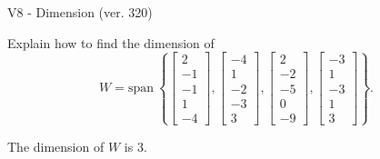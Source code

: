 \begin{exercise}
  \begin{exerciseTitle}V8 - Dimension (ver. 320)\end{exerciseTitle}
  \begin{exerciseStatement}
    Explain how to find the dimension of 
\[W=\mathrm{span}\ \left\{\left[\begin{array}{r}
2 \\
-1 \\
-1 \\
1 \\
-4
\end{array}\right] , \left[\begin{array}{r}
-4 \\
1 \\
-2 \\
-3 \\
3
\end{array}\right] , \left[\begin{array}{r}
2 \\
-2 \\
-5 \\
0 \\
-9
\end{array}\right] , \left[\begin{array}{r}
-3 \\
1 \\
-3 \\
1 \\
3
\end{array}\right]\right\}.\]



  \end{exerciseStatement}
  \begin{exerciseAnswer}
   The dimension of \(W\) is  \(3\).
  


  \end{exerciseAnswer}
\end{exercise}